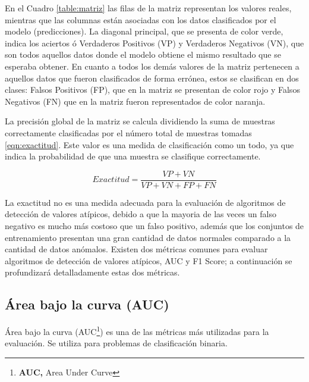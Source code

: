 \vspace{5mm} %

En el Cuadro \ref{table:matriz} las filas de la matriz representan los valores reales, mientras que las columnas est\'{a}n asociadas con los datos clasificados por el modelo (predicciones). La diagonal principal, que se presenta de color verde, indica los aciertos \'{o} Verdaderos Positivos (VP) y Verdaderos Negativos (VN), que son todos aquellos datos donde el modelo obtiene el mismo resultado que se esperaba obtener. En cuanto a todos los dem\'{a}s valores de la matriz pertenecen a aquellos datos que fueron clasificados de forma err\'{o}nea, estos se clasifican en dos clases: Falsos Positivos (FP), que en la matriz se presentan de color rojo y Falsos Negativos (FN) que en la matriz fueron representados de color naranja.

\vspace{5mm} %

La precisi\'{o}n global de la matriz se calcula dividiendo la suma de muestras correctamente clasificadas por el n\'{u}mero total de muestras tomadas \ref{eqn:exactitud}. Este valor es una medida de clasificaci\'{o}n como un todo, ya que indica la probabilidad de que una muestra se clasifique correctamente.

\begin{equation}
Exactitud=\frac{VP+VN}{VP+VN+FP+FN}
\label{eqn:exactitud}
\end{equation}

La exactitud no es una medida adecuada para la evaluaci\'{o}n de algoritmos de detecci\'{o}n de valores at\'{i}picos, debido a que la mayoria de las veces un falso negativo es mucho m\'{a}s costoso que un falso positivo, adem\'{a}s que los conjuntos de entrenamiento presentan una gran cantidad de datos normales comparado a la cantidad de datos an\'{o}malos. Existen dos m\'{e}tricas comunes para evaluar algoritmos de detecci\'{o}n de valores at\'{i}picos, AUC y F1 Score; a continuaci\'{o}n se profundizar\'{a} detalladamente estas dos m\'{e}tricas.

\subsection{\'{A}rea bajo la curva (AUC)}

\'{A}rea bajo la curva (AUC\footnote{\textbf{AUC, }Area Under Curve}) es una de las m\'{e}tricas m\'{a}s utilizadas para la evaluaci\'{o}n. Se utiliza para problemas de clasificaci\'{o}n binaria.

